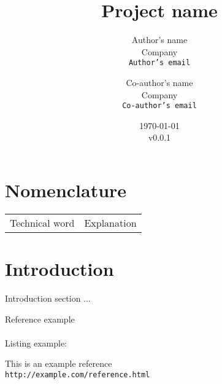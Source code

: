 \documentclass{documentation}
\title{Project name}
\author{
  Author's name\\
  Company\\
  \texttt{Author's email}
  \and
  Co-author's name\\
  Company\\
  \texttt{Co-author's email}
}
\date{\today \\ \small v0.0.1}
\begin{document}
\maketitle
\thispagestyle{empty} %
\titlepage

\tableofcontents
\clearpage
\setcounter{page}{1} %

\section{Nomenclature}
\begin{tabular}{l l}
    Technical word & Explanation \\
\end{tabular}

\section{Introduction}

Introduction section ...




Reference example \cite{example-reference} 
\\ \\
Listing example:
%    



\clearpage

\begin{thebibliography}{9}


This is an example reference
\\\texttt{http://example.com/reference.html}

\end{thebibliography}
\end{document}
